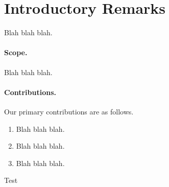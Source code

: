 \section{Introductory Remarks}

Blah blah blah.

 

\paragraph{Scope.} 
Blah blah blah.


\paragraph{Contributions.} 
Our primary contributions are as follows.

\begin{enumerate}

\item Blah blah blah.

\item Blah blah blah. 

\item Blah blah blah. 

\end{enumerate}

Test~\cite{KNZ08}


